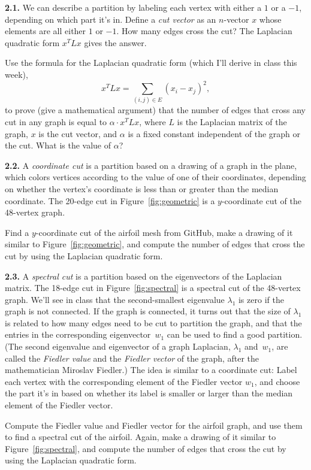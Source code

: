 \documentclass[11pt]{article}
\begin{document}
\newpage
\par\medskip
{\bf 2.1.}
We can describe a partition by labeling each vertex with either a $1$ or a $-1$, 
depending on which part it's in.
Define a {\em cut vector} as an $n$-vector $x$ whose elements are all either $1$ or $-1$.
How many edges cross the cut?
The Laplacian quadratic form $x^TLx$ gives the answer.

Use the formula for the Laplacian quadratic form (which I'll derive in class this week),
$$x^TLx = \sum_{(i,j)\in E}(x_i-x_j)^2,$$
to prove (give a mathematical argument)
that the number of edges that cross any cut in any graph is equal to
$\alpha \cdot x^TLx$, 
where $L$ is the Laplacian matrix of the graph, 
$x$ is the cut vector,
and $\alpha$ is a fixed constant independent of the graph or the cut. 
What is the value of $\alpha$?

\par\medskip
{\bf 2.2.}
A {\em coordinate cut} is a partition based on a drawing of a graph in the plane,
which colors vertices according to the value of one of their coordinates,
depending on whether the vertex's coordinate is less than or greater than the
median coordinate.
The 20-edge cut in Figure~\ref{fig:geometric} 
is a $y$-coordinate cut of the 48-vertex graph.

Find a $y$-coordinate cut of the airfoil mesh from GitHub,
make a drawing of it similar to Figure~\ref{fig:geometric}, 
and compute the number of edges that cross the cut by using the Laplacian quadratic form.

\par\medskip
{\bf 2.3.}
A {\em spectral cut} is a partition based on the eigenvectors of the Laplacian matrix.
The 18-edge cut in Figure~\ref{fig:spectral} is a spectral cut of the 48-vertex graph.
We'll see in class that the second-smallest eigenvalue $\lambda_1$ is zero if the graph is
not connected.
If the graph is connected, it turns out that
the size of $\lambda_1$ is related to how many edges need to be cut to partition the 
graph, and that the entries in the corresponding eigenvector~$w_1$ can be used to
find a good partition.
(The second eigenvalue and eigenvector of a graph Laplacian, $\lambda_1$ and~$w_1$,
are called the {\em Fiedler value} and the {\em Fiedler vector} of the graph, 
after the mathematician Miroslav Fiedler.)
The idea is similar to a coordinate cut:
Label each vertex with the corresponding element of the Fiedler vector $w_1$,
and choose the part it's in based on whether its label is smaller or larger
than the median element of the Fiedler vector.

Compute the Fiedler value and Fiedler vector for the airfoil graph, 
and use them to find a spectral cut of the airfoil.
Again, make a drawing of it similar to Figure~\ref{fig:spectral}, 
and compute the number of edges that cross the cut by using the Laplacian quadratic form.
\end{document}
